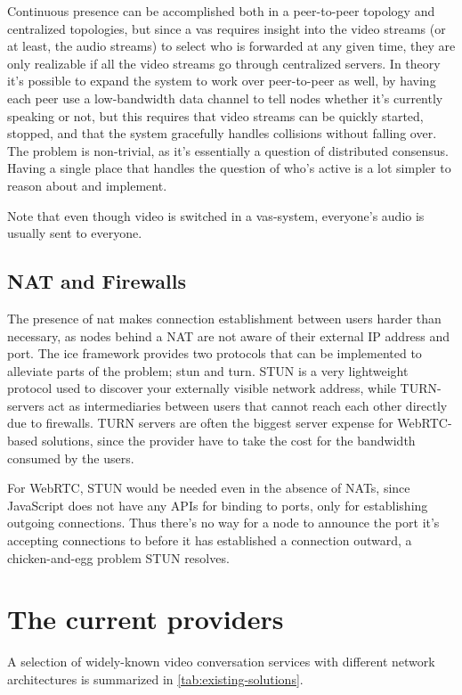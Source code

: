 Continuous presence can be accomplished both in a peer-to-peer topology and centralized topologies, but since a \gls{vas} requires insight into the video streams (or at least, the audio streams) to select who is forwarded at any given time, they are only realizable if all the video streams go through centralized servers. In theory it's possible to expand the system to work over peer-to-peer as well, by having each peer use a low-bandwidth data channel to tell nodes whether it's currently speaking or not, but this requires that video streams can be quickly started, stopped, and that the system gracefully handles collisions without falling over. The problem is non-trivial, as it's essentially a question of distributed consensus. Having a single place that handles the question of who's active is a lot simpler to reason about and implement.

Note that even though video is switched in a \gls{vas}-system, everyone's audio is usually sent to everyone.

\subsection{NAT and Firewalls}

The presence of \gls{nat} makes connection establishment between users harder than necessary, as nodes behind a NAT are not aware of their external IP address and port. The \gls{ice} framework provides two protocols that can be implemented to alleviate parts of the problem; \gls{stun} and \gls{turn}. STUN is a very lightweight protocol used to discover your externally visible network address, while TURN-servers act as intermediaries between users that cannot reach each other directly due to firewalls. TURN servers are often the biggest server expense for WebRTC-based solutions, since the provider have to take the cost for the bandwidth consumed by the users.

For WebRTC, STUN would be needed even in the absence of NATs, since JavaScript does not have any APIs for binding to ports, only for establishing outgoing connections. Thus there's no way for a node to announce the port it's accepting connections to before it has established a connection outward, a chicken-and-egg problem STUN resolves.


\section{The current providers}

A selection of widely-known video conversation services with different network architectures is summarized in \autoref{tab:existing-solutions}.

